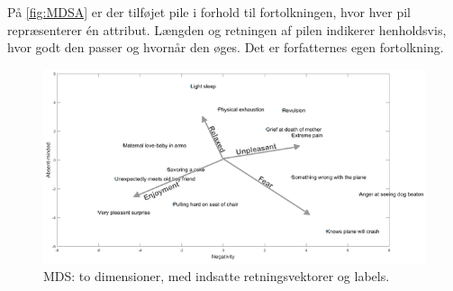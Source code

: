%
På \autoref{fig:MDSA} er der tilføjet pile i forhold til fortolkningen, hvor hver pil repræsenterer én attribut. Længden og retningen af pilen indikerer henholdsvis, hvor godt den passer og hvornår den øges. Det er forfatternes egen fortolkning. 
%
\begin{figure}[H]
\centering
\includegraphics[width =\textwidth]{Figure/MSD_PlotArrows.png} 
\caption{MDS: to dimensioner, med indsatte retningsvektorer og labels.}
\label{fig:MDSA}
\end{figure}
\noindent
%